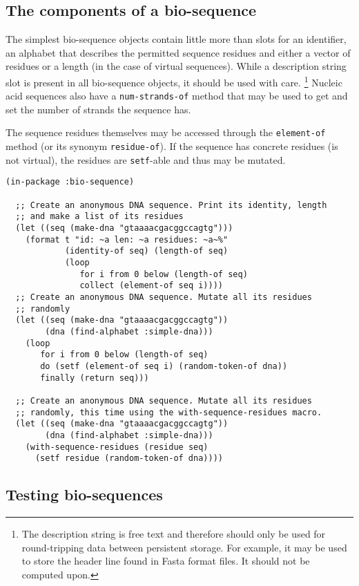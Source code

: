 \documentclass[a4paper, 12pt]{article}
\begin{document}
\subsection{The components of a bio-sequence}
\label{sec:component-bioseq}

The simplest bio-sequence objects contain little more than slots for
an identifier, an alphabet that describes the permitted sequence
residues and either a vector of residues or a length (in the case of
virtual sequences). While a description string slot is present in all
bio-sequence objects, it should be used with care. \footnote{The
  description string is free text and therefore should only be used
  for round-tripping data between persistent storage. For example, it
  may be used to store the header line found in Fasta format files. It
  should not be computed upon.}  Nucleic acid sequences also have a
\lstinline!num-strands-of! method that may be used to get and set the
number of strands the sequence has.

The sequence residues themselves may be accessed through the
\lstinline!element-of! method (or its synonym
\lstinline!residue-of!). If the sequence has concrete residues (is not
virtual), the residues are \lstinline!setf!-able and thus may be
mutated.


\begin{lstlisting}[caption={The components of a bio-sequence},
  label=use-bioseq-alphabets]
  (in-package :bio-sequence)

  ;; Create an anonymous DNA sequence. Print its identity, length
  ;; and make a list of its residues
  (let ((seq (make-dna "gtaaaacgacggccagtg")))
    (format t "id: ~a len: ~a residues: ~a~%"
            (identity-of seq) (length-of seq)
            (loop
               for i from 0 below (length-of seq)
               collect (element-of seq i))))
  ;; Create an anonymous DNA sequence. Mutate all its residues
  ;; randomly
  (let ((seq (make-dna "gtaaaacgacggccagtg"))
        (dna (find-alphabet :simple-dna)))
    (loop
       for i from 0 below (length-of seq)
       do (setf (element-of seq i) (random-token-of dna))
       finally (return seq)))
  
  ;; Create an anonymous DNA sequence. Mutate all its residues
  ;; randomly, this time using the with-sequence-residues macro.
  (let ((seq (make-dna "gtaaaacgacggccagtg"))
        (dna (find-alphabet :simple-dna)))
    (with-sequence-residues (residue seq)
      (setf residue (random-token-of dna))))
\end{lstlisting}


\subsection{Testing bio-sequences}



\end{document}
